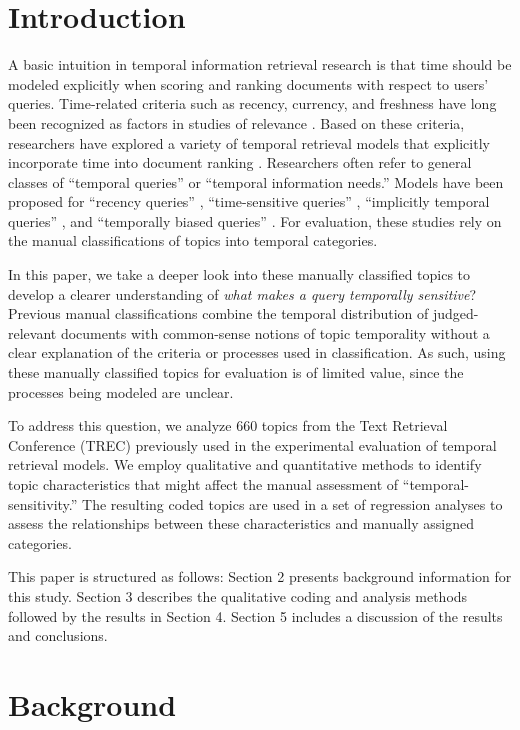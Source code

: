 \documentclass[runningheads,a4paper]{llncs}
\begin{document}
\section{Introduction}

A basic intuition in temporal information retrieval research is that time should be modeled explicitly when scoring and ranking documents with respect to users' queries. Time-related criteria such as recency, currency, and freshness have long been recognized as factors in studies of relevance \cite{Barry1998}. Based on these criteria, researchers have explored a variety of temporal retrieval models that explicitly incorporate time into document ranking \cite{Li2003,Efron2011,Dakka2012}. Researchers often refer to general classes of ``temporal queries'' or ``temporal information needs.''  Models have been proposed for ``recency queries'' \cite{Li2003,Efron2011}, ``time-sensitive queries'' \cite{Dakka2012}, ``implicitly temporal queries'' \cite{Metzler2009}, and ``temporally biased queries'' \cite{Jones2007}.  For evaluation,  these studies rely on the manual classifications of topics into temporal categories.

In this paper, we take a deeper look into these manually classified topics to develop a clearer understanding of \emph{what makes a query temporally sensitive}?  Previous manual classifications combine the temporal distribution of judged-relevant documents with common-sense notions of topic temporality without a clear explanation of the criteria or processes used in classification. As such, using these manually classified topics for evaluation is of limited value, since the processes being modeled are unclear. 

To address this question, we analyze  660 topics from the Text Retrieval Conference (TREC) previously used in the experimental evaluation of temporal retrieval models. We employ qualitative and quantitative methods to identify topic characteristics that might affect the manual assessment of ``temporal-sensitivity.'' The resulting coded topics are used in a set of regression analyses to assess the relationships between these characteristics and manually assigned categories. 

This paper is structured as follows: Section 2 presents background information for this study. Section 3 describes the qualitative coding and analysis methods followed by the results in Section 4. Section 5 includes a discussion of the results and conclusions.

\section{Background}
\end{document}
